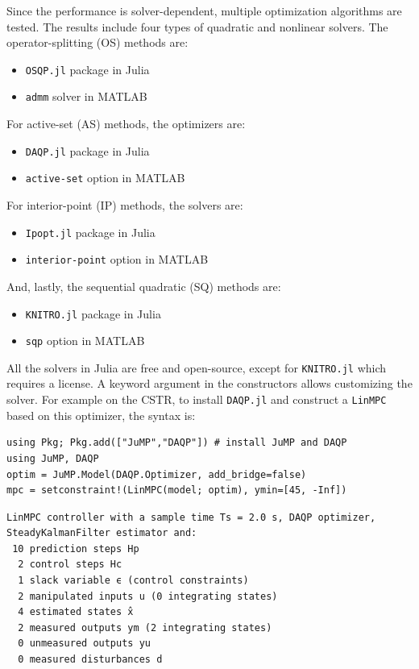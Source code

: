 Since the performance is solver-dependent, multiple optimization algorithms are tested. The results include four types of quadratic and nonlinear solvers. The operator-splitting (OS) methods are: 
\begin{itemize}
    \item \texttt{OSQP.jl} package in Julia \citep{osqp}
    \item \texttt{admm} solver in MATLAB \citep{admm}
\end{itemize}
For active-set (AS) methods, the optimizers are: 
\begin{itemize}
    \item \texttt{DAQP.jl} package in Julia \citep{daqp}
    \item \texttt{active-set} option in MATLAB \citep{activeset}
\end{itemize}
For interior-point (IP) methods, the solvers are: 
\begin{itemize}
    \item \texttt{Ipopt.jl} package in Julia \citep{ipopt}
    \item \texttt{interior-point} option in MATLAB \citep{interiorpoint}
\end{itemize}
And, lastly, the sequential quadratic (SQ) methods are:
\begin{itemize}
    \item \texttt{KNITRO.jl} package in Julia \citep{knitro}
    \item \texttt{sqp} option in MATLAB \citep{sqp}
\end{itemize}

All the solvers in Julia are free and open-source, except for \texttt{KNITRO.jl} which requires a license. A keyword argument in the constructors allows customizing the solver. For example on the CSTR, to install \texttt{DAQP.jl} and construct a \texttt{LinMPC} based on this optimizer, the syntax is:

\begin{verbatim}
using Pkg; Pkg.add(["JuMP","DAQP"]) # install JuMP and DAQP
using JuMP, DAQP
optim = JuMP.Model(DAQP.Optimizer, add_bridge=false)
mpc = setconstraint!(LinMPC(model; optim), ymin=[45, -Inf])
\end{verbatim}
\spacerepl
\begin{verbatim}
LinMPC controller with a sample time Ts = 2.0 s, DAQP optimizer,
SteadyKalmanFilter estimator and:
 10 prediction steps Hp
  2 control steps Hc
  1 slack variable ϵ (control constraints)
  2 manipulated inputs u (0 integrating states)
  4 estimated states x̂
  2 measured outputs ym (2 integrating states)
  0 unmeasured outputs yu
  0 measured disturbances d
\end{verbatim}

